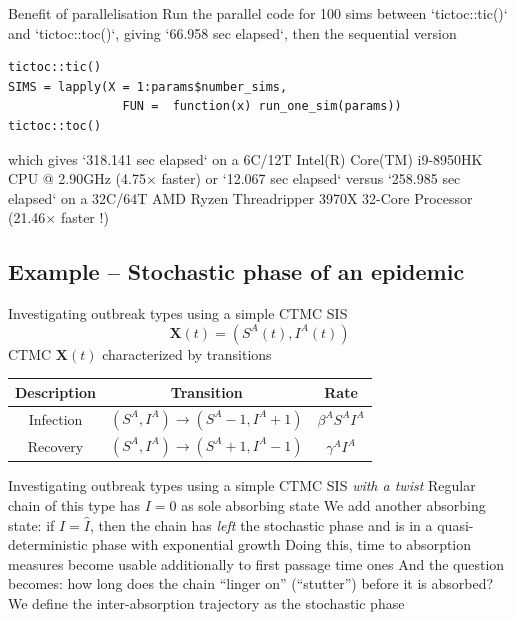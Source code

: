 \documentclass[aspectratio=169]{beamer}\usepackage[]{graphicx}\usepackage[]{xcolor}
\begin{document}
\begin{frame}

\end{frame}


\begin{frame}[fragile]{Benefit of parallelisation}
    Run the parallel code for 100 sims between `tictoc::tic()` and `tictoc::toc()`, giving `66.958 sec elapsed`, then the sequential version
\begin{lstlisting}
tictoc::tic()
SIMS = lapply(X = 1:params$number_sims,
                FUN =  function(x) run_one_sim(params))
tictoc::toc()
\end{lstlisting}
    which gives `318.141 sec elapsed` on a 6C/12T Intel(R) Core(TM) i9-8950HK CPU @ 2.90GHz (4.75$\times$ faster) or `12.067 sec elapsed` versus `258.985 sec elapsed` on a 32C/64T AMD Ryzen Threadripper 3970X 32-Core Processor (21.46$\times$ faster !)
\end{frame}


\subsection{Example -- Stochastic phase of an epidemic}

\nocite{ArinoMilliken2022b}


\begin{frame}{Investigating outbreak types using a simple CTMC SIS}
\[
\mathbf{X}(t)=\left(S^A(t),I^A(t)\right)
\]
\vfill
CTMC $\mathbf{X}(t)$ characterized by transitions
\begin{center}
  \begin{tabular}{ccc}
    \toprule
    Description & Transition & Rate \\
    \midrule
    Infection & $\left(S^A,I^A\right)\to \left(S^A-1,I^A+1\right)$ & $\beta^AS^AI^A$ \\
    Recovery & $\left(S^A,I^A\right)\to \left(S^A+1,I^A-1\right)$ & $\gamma^AI^A$ \\
    \bottomrule
  \end{tabular}
\end{center}
\end{frame}

\begin{frame}{Investigating outbreak types using a simple CTMC SIS \emph{with a twist}}
Regular chain of this type has $I=0$ as sole absorbing state
\vfill
We add another absorbing state: if $I=\hat I$, then the chain has \emph{left} the stochastic phase and is in a quasi-deterministic phase with exponential growth
\vfill
Doing this, time to absorption measures become usable additionally to first passage time ones
\vfill
And the question becomes: how long does the chain ``linger on'' (``stutter'') before it is absorbed? We define the inter-absorption trajectory as the stochastic phase
\end{frame}
\end{document}
